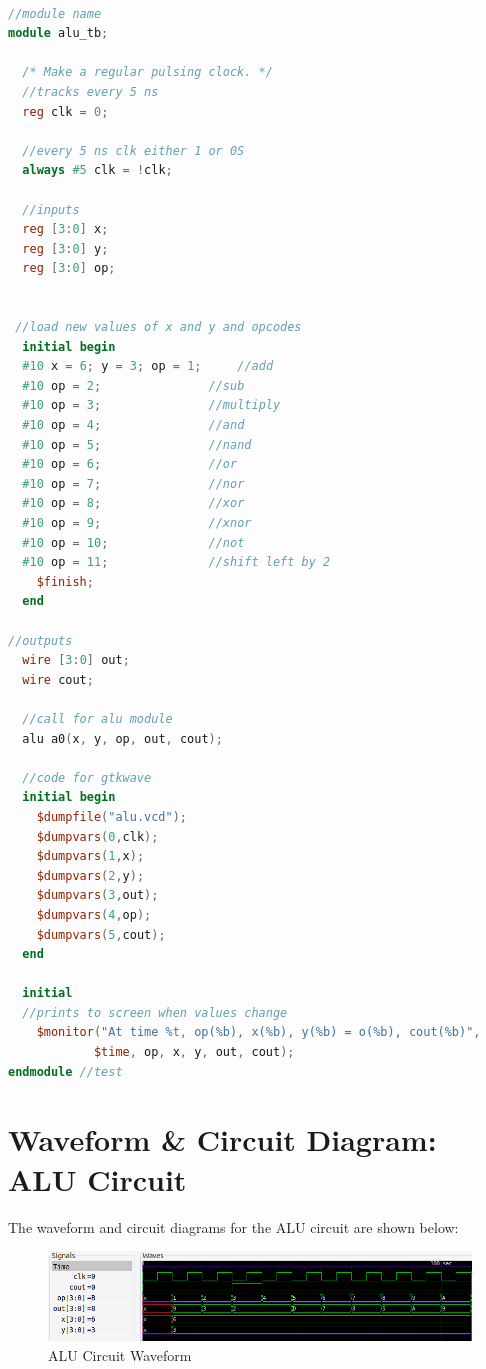 \documentclass[runningheads, 12pt]{report}
\begin{document}
\begin{lstlisting}[language=Verilog, caption={ALU Circuit Test Bench}]

//module name
module alu_tb;		

  /* Make a regular pulsing clock. */	
  //tracks every 5 ns
  reg clk = 0;
  
  //every 5 ns clk either 1 or 0S
  always #5 clk = !clk;		

  //inputs	  
  reg [3:0] x;				
  reg [3:0] y;
  reg [3:0] op;
    

 //load new values of x and y and opcodes 
  initial begin				
  #10 x = 6; y = 3; op = 1;		//add
  #10 op = 2;				//sub
  #10 op = 3;				//multiply
  #10 op = 4;				//and
  #10 op = 5;				//nand
  #10 op = 6;				//or
  #10 op = 7;				//nor
  #10 op = 8;				//xor
  #10 op = 9;				//xnor
  #10 op = 10;				//not
  #10 op = 11;				//shift left by 2
	$finish;
  end

//outputs
  wire [3:0] out;			
  wire cout;
  
  //call for alu module
  alu a0(x, y, op, out, cout);		 
  
  //code for gtkwave
  initial begin				
    $dumpfile("alu.vcd");
    $dumpvars(0,clk);
    $dumpvars(1,x);
    $dumpvars(2,y);
    $dumpvars(3,out);
    $dumpvars(4,op);
    $dumpvars(5,cout);
  end
  
  initial				
  //prints to screen when values change
    $monitor("At time %t, op(%b), x(%b), y(%b) = o(%b), cout(%b)",  
    		$time, op, x, y, out, cout);
endmodule //test
\end{lstlisting}

\section{Waveform \& Circuit Diagram: ALU Circuit}	

The waveform and circuit diagrams for the ALU circuit are shown below:

\begin{figure}[h]
	\centering
	\includegraphics[width=1.05\textwidth]{alu_waveform}
	\caption{ALU Circuit Waveform}
	\label{fig: alu_waveform}
\end{figure}
\end{document}
